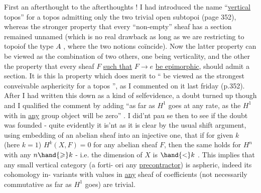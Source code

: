 First an afterthought to the afterthoughts ! I had introduced
the name ``\uline{vertical} topos'' for a topos admitting only the two trivial
open subtopoi (page 352), whereas the stronger property that every
``non-empty'' sheaf has a section remained unnamed (which is no real
drawback as long as we are restricting to topoi\hand{/}of the type $A\hat{}$ , where
 the two notions coïncide). Now the latter property can be viewed as
the combination of two others, one being verticality, and the other
the property that every sheaf $F$ \uline{such that} $F \to e$ \uline{be epimorphic},
should admit a section. It is this la property which does merit
to `` be viewed as the strongest conveivable asphericity  for a topos '',
as I commented on it last friday (p.352). After I had written this
down as a kind of selfevidence,  a doubt turned up though and I
qualified the comment by adding ``as far as $H^1$ goes at any rate, as
the $H^1$ with   in \uline{any} group object will be zero'' . I did'nt pau
se then to see if the doubt was founded - quite evidently it is'nt\hand{,}
 as it is clear by the usual shift argument, using embedding of 
an abelian sheaf into an injective one, that if  for given
$k$ (here $k=1$) $H^k(X,F) = 0$ for any abelian sheaf $F$, then the same
holds for $H^n$ with any $n \hand{\geqslant} k$ - i.e. the   dimension of $X$
is $\hand{<} k$ . This implies that  any small vertical category (a forti-%
ori any  \uline{precontractor}) is aspheric, indeed its cohomology in-%
variants with values in \uline{any} sheaf of coefficients (not necessarily
commutative as far as $H^1$ goes) are trivial.

